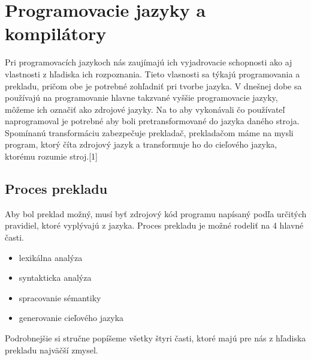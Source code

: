 \section{Programovacie jazyky a kompilátory}
\indent Pri programovacích jazykoch nás zaujímajú ich vyjadrovacie schopnosti ako aj vlastnosti z hľadiska ich rozpoznania. Tieto vlasnosti sa týkajú programovania a prekladu, pričom obe je potrebné zohľadniť pri tvorbe jazyka. V dnešnej dobe sa používajú na programovanie hlavne takzvané vyššie programovacie jazyky, môžeme ich označiť ako zdrojové jazyky. Na to aby vykonávali čo používateľ naprogramoval je potrebné aby boli pretransformované do jazyka daného stroja. Spomínanú transformáciu zabezpečuje prekladač, prekladačom máme na mysli program, ktorý číta zdrojový jazyk a transformuje ho do cieľového jazyka, ktorému rozumie stroj.[1]

\subsection{Proces prekladu}
Aby bol preklad možný, musí byť zdrojový kód programu napísaný podľa určitých pravidiel, ktoré vyplývajú z jazyka. Proces prekladu je možné rodeliť na 4 hlavné časti.
\begin{itemize}
	\item lexikálna analýza
	\item syntakticka analýza
	\item spracovanie sémantiky
	\item generovanie cieľového jazyka
\end{itemize}
\indent Podrobnejšie si stručne popíšeme všetky štyri časti, ktoré majú pre nás z hľadiska prekladu najväčší zmysel.
\newline
